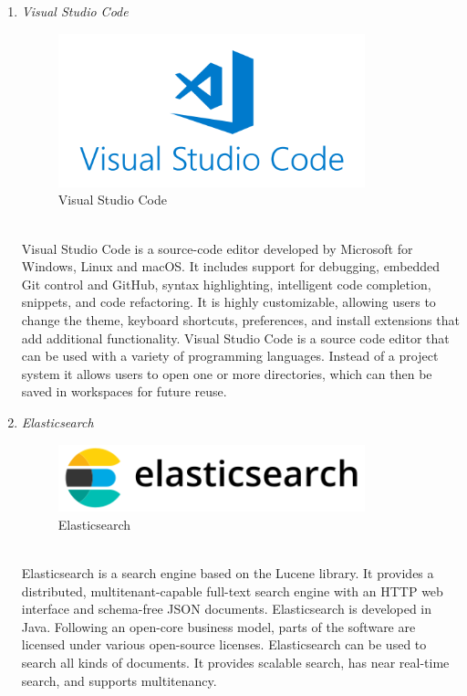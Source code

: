 \documentclass[conference]{IEEEtran}
\begin{document}
\begin{enumerate}
   \vspace{30mm}

      \item \textit{Visual Studio Code }
                      \begin{figure}[htbp]
    \centerline{\includegraphics[width=89mm, scale=0.5]{fig/vscode.png}}
    \caption{Visual Studio Code}
    \label{fig}
    \end{figure}
   \\Visual Studio Code is a source-code editor developed by Microsoft for Windows, Linux and macOS. It includes support for debugging, embedded Git control and GitHub, syntax highlighting, intelligent code completion, snippets, and code refactoring. It is highly customizable, allowing users to change the theme, keyboard shortcuts, preferences, and install extensions that add additional functionality. Visual Studio Code is a source code editor that can be used with a variety of programming languages. Instead of a project system it allows users to open one or more directories, which can then be saved in workspaces for future reuse.\\
   
      \vspace{20mm}

      \item \textit{Elasticsearch }
                      \begin{figure}[htbp]
    \centerline{\includegraphics[width=89mm, scale=0.5]{fig/elasticsearch.png}}
    \caption{Elasticsearch}
    \label{fig}
    \end{figure}
   \\Elasticsearch is a search engine based on the Lucene library. It provides a distributed, multitenant-capable full-text search engine with an HTTP web interface and schema-free JSON documents. Elasticsearch is developed in Java. Following an open-core business model, parts of the software are licensed under various open-source licenses. Elasticsearch can be used to search all kinds of documents. It provides scalable search, has near real-time search, and supports multitenancy.\\
 
\end{enumerate}
   \vspace{10mm}
\end{document}
